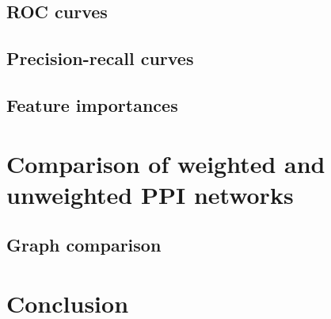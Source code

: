 

\subsection{ROC curves}




\subsection{Precision-recall curves}




\subsection{Feature importances}




\section{Comparison of weighted and unweighted PPI networks}




\subsection{Graph comparison}


\section*{Conclusion}


